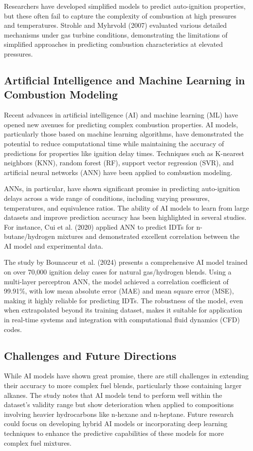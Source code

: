 \documentclass[12pt]{report}
\begin{document}
Researchers have developed simplified models to predict auto-ignition properties, but these often fail to capture the complexity of combustion at high pressures and temperatures. Strohle and Myhrvold (2007) evaluated various detailed mechanisms under gas turbine conditions, demonstrating the limitations of simplified approaches in predicting combustion characteristics at elevated pressures.

\subsection{Artificial Intelligence and Machine Learning in Combustion Modeling}
Recent advances in artificial intelligence (AI) and machine learning (ML) have opened new avenues for predicting complex combustion properties. AI models, particularly those based on machine learning algorithms, have demonstrated the potential to reduce computational time while maintaining the accuracy of predictions for properties like ignition delay times. Techniques such as K-nearest neighbors (KNN), random forest (RF), support vector regression (SVR), and artificial neural networks (ANN) have been applied to combustion modeling.

ANNs, in particular, have shown significant promise in predicting auto-ignition delays across a wide range of conditions, including varying pressures, temperatures, and equivalence ratios. The ability of AI models to learn from large datasets and improve prediction accuracy has been highlighted in several studies. For instance, Cui et al. (2020) applied ANN to predict IDTs for n-butane/hydrogen mixtures and demonstrated excellent correlation between the AI model and experimental data.

The study by Bounaceur et al. (2024) presents a comprehensive AI model trained on over 70,000 ignition delay cases for natural gas/hydrogen blends. Using a multi-layer perceptron ANN, the model achieved a correlation coefficient of 99.91\%, with low mean absolute error (MAE) and mean square error (MSE), making it highly reliable for predicting IDTs. The robustness of the model, even when extrapolated beyond its training dataset, makes it suitable for application in real-time systems and integration with computational fluid dynamics (CFD) codes.

\subsection{Challenges and Future Directions}
While AI models have shown great promise, there are still challenges in extending their accuracy to more complex fuel blends, particularly those containing larger alkanes. The study notes that AI models tend to perform well within the dataset’s validity range but show deterioration when applied to compositions involving heavier hydrocarbons like n-hexane and n-heptane. Future research could focus on developing hybrid AI models or incorporating deep learning techniques to enhance the predictive capabilities of these models for more complex fuel mixtures.
\end{document}
